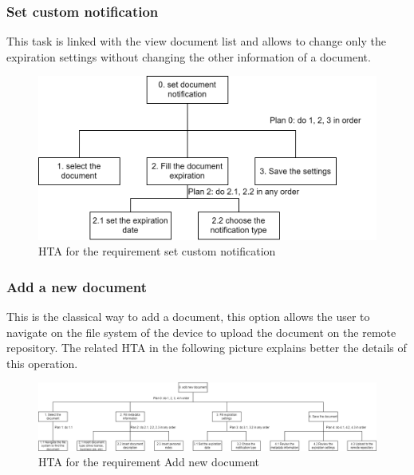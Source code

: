 \subsubsection{Set custom notification}
This task is linked with the view document list and allows to change only the expiration settings without changing the other information of a document. 
\begin{figure}[H]
	\centering
	\includegraphics[width=\textwidth]{../Draw.io diagrams/set_notification.drawio.png}  %
	\caption{HTA for the requirement set custom notification}
\end{figure}
\subsubsection{Add a new document}
This is the classical way to add a document, this option allows the user to navigate on the file system of the device to upload the document on the remote repository.
The related HTA in the following picture explains better the details of this operation.
\begin{figure}[H]
	\centering
	\includegraphics[width=\textwidth]{../Draw.io diagrams/add_new_document.drawio.png}  %
	\caption{HTA for the requirement Add new document}
\end{figure}
